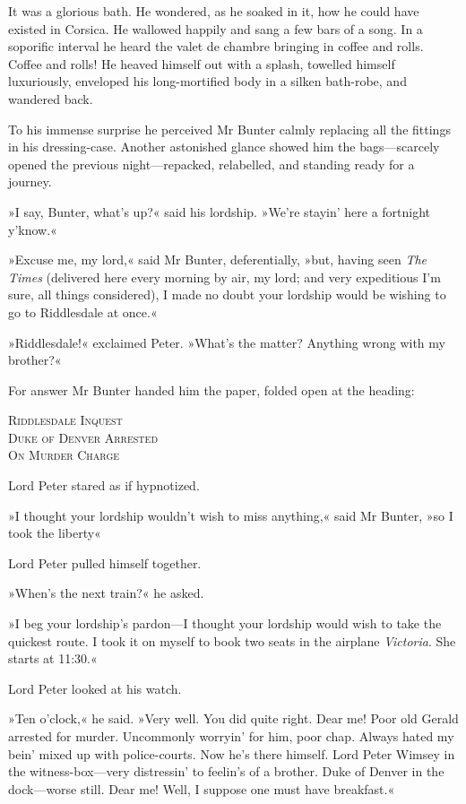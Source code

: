 It was a glorious bath. He wondered, as he soaked in it, how he could have existed in Corsica. He wallowed happily and sang a few bars of a song. In a soporific interval he heard the valet de chambre bringing in coffee and rolls. Coffee and rolls! He heaved himself out with a splash, towelled himself luxuriously, enveloped his long-mortified body in a silken bath-robe, and wandered back.

To his immense surprise he perceived Mr Bunter calmly replacing all the fittings in his dressing-case. Another astonished glance showed him the bags—scarcely opened the previous night—repacked, relabelled, and standing ready for a journey.

»I say, Bunter, what's up?« said his lordship. »We're stayin' here a fortnight y'know.«

»Excuse me, my lord,« said Mr Bunter, deferentially, »but, having seen \textit{The Times} (delivered here every morning by air, my lord; and very expeditious I'm sure, all things considered), I made no doubt your lordship would be wishing to go to Riddlesdale at once.«

»Riddlesdale!« exclaimed Peter. »What's the matter? Anything wrong with my brother?«

For answer Mr Bunter handed him the paper, folded open at the heading:
\begin{center}
\textsc{Riddlesdale Inquest\\
Duke of Denver Arrested\\
On Murder Charge}
\end{center}


Lord Peter stared as if hypnotized.

»I thought your lordship wouldn't wish to miss anything,« said Mr  Bunter, »so I took the liberty\longdash«

Lord Peter pulled himself together.

»When's the next train?« he asked.

»I beg your lordship's pardon—I thought your lordship would wish to take the quickest route. I took it on myself to book two seats in the airplane \textit{Victoria}. She starts at 11:30.«

Lord Peter looked at his watch.

»Ten o'clock,« he said. »Very well. You did quite right. Dear me! Poor old Gerald arrested for murder. Uncommonly worryin' for him, poor chap.  Always hated my bein' mixed up with police-courts. Now he's there himself. Lord Peter Wimsey in the witness-box—very distressin' to feelin's of a brother. Duke of Denver in the dock—worse still. Dear me! Well, I suppose one must have breakfast.«

